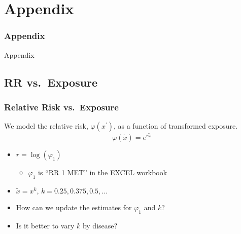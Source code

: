 \documentclass[handout,13pt,compress,c]{beamer}
\newcommand{\bi}{\begin{itemize}}
\newcommand{\ei}{\end{itemize}}
\begin{document}
\section{Appendix}
\begin{frame}[fragile]
\frametitle{Appendix}
\begin{center}Appendix\end{center}
\end{frame}
\subsection{RR vs.\ Exposure}
\begin{frame}[fragile]
\label{RR}
\frametitle{Relative Risk vs.\ Exposure}
We model the relative risk, $\varphi(x^\prime)$, as a function of
transformed exposure.
\begin{equation}
\varphi\left(\tilde{x}\right) = e^{r \tilde{x}}
\end{equation}
\bi
\item $r=\log\left(\varphi_1\right)$ \bi\item$\varphi_1$ is ``RR 1 MET'' in the EXCEL workbook\ei
\item $\tilde{x}=x^k$, $k=0.25,0.375,0.5,\ldots$
\ei
\bi
\item How can we update the estimates for $\varphi_1$ and $k$?
\item Is it better to vary $k$ by disease?\ei
\end{frame}
\end{document}
